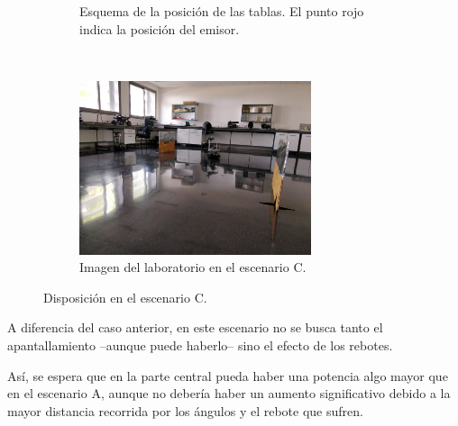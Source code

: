 \begin{figure}[H]
    \centering
    \begin{subfigure}[b]{0.45\textwidth}
        \centering
        
        \caption{Esquema de la posición de las tablas. El punto rojo indica la posición del emisor.}
    \end{subfigure}
    ~~
    \begin{subfigure}[b]{0.45\textwidth}
        \centering
        \includegraphics[width=6.8cm]{pic/escC.jpg}
        \caption{Imagen del laboratorio en el escenario C.}
    \end{subfigure}
    \caption{Disposición en el escenario C.}
    \label{fig:escenarioC}
\end{figure}

A diferencia del caso anterior, en este escenario no se busca tanto el apantallamiento --aunque puede haberlo-- sino el efecto de los rebotes.

Así, se espera que en la parte central pueda haber una potencia algo mayor que en el escenario A, aunque no debería haber un aumento significativo debido a la mayor distancia recorrida por los ángulos y el rebote que sufren.

